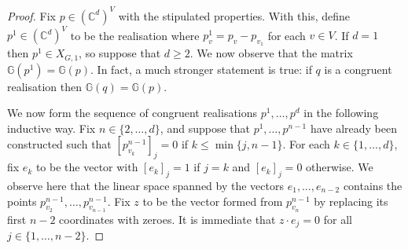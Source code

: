 \documentclass[ALCO]{cedram}
\begin{document}
\begin{proof}
	Fix $p \in (\mathbb{C}^d)^V$ with the stipulated properties.
	With this,
	define $p^1 \in (\mathbb{C}^d)^V$ to be the realisation where $p^1_v = p_v - p_{v_1}$ for each $v \in V$.
	If $d=1$ then $p^1 \in X_{G,1}$,
	so suppose that $d \geq 2$.
	We now observe that the matrix $\mathbb{G}(p^1) = \mathbb{G}(p)$.
	In fact, a much stronger statement is true:
	if $q$ is a congruent realisation then $\mathbb{G}(q) = \mathbb{G}(p)$.
	
	We now form the sequence of congruent realisations $p^1,\ldots,p^d$ in the following inductive way.
	Fix $n \in \{2,\ldots,d\}$,
	and suppose that $p^1,\ldots,p^{n-1}$ have already been constructed such that $[p^{n-1}_{v_k}]_j =0$ if $k \leq \min \{j, n-1\}$.
	For each $k \in \{1,\ldots,d\}$,
	fix $e_k$ to be the vector with $[e_k]_j = 1$ if $j=k$ and $[e_k]_j = 0$ otherwise.
	We observe here that the linear space spanned by the vectors $e_1,\ldots, e_{n-2}$ contains the points $p^{n-1}_{v_2},\ldots, p^{n-1}_{v_{n-1}}$.
	Fix $z$ to be the vector formed from $p^{n-1}_{v_{n}}$ by replacing its first $n-2$ coordinates with zeroes.
	It is immediate that $z \cdot e_j = 0$ for all $j \in \{1 , \ldots, n-2\}$.
	

\end{proof}
\end{document}
